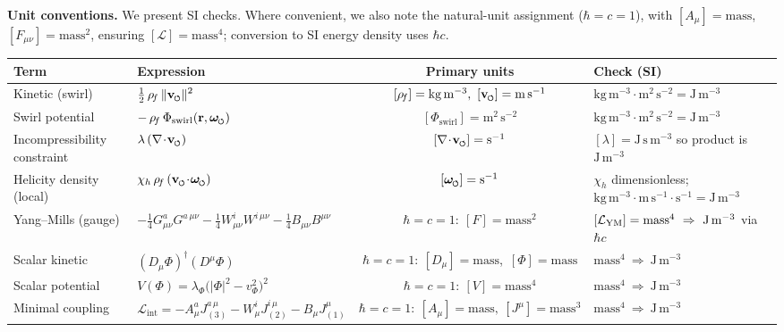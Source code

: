 \documentclass[11pt]{article}
\newcommand{\GsA}{G^a_{\mu\nu}}
\newcommand{\WsI}{W^i_{\mu\nu}}
\newcommand{\Bmn}{B_{\mu\nu}}
\begin{document}
\noindent\textbf{Unit conventions.}
We present SI checks. Where convenient, we also note the natural-unit assignment
($\hbar=c=1$), with \([A_\mu]=\text{mass}\), \([F_{\mu\nu}]=\text{mass}^2\), ensuring \([\mathcal L]=\text{mass}^4\);
conversion to SI energy density uses \(\hbar c\).

\begin{center}
	\renewcommand{\arraystretch}{1.2}
	\begin{tabular}{@{}llcl@{}}
		\toprule
		\textbf{Term} & \textbf{Expression} & \textbf{Primary units} & \textbf{Check (SI)} \\
		\midrule
		Kinetic (swirl) &
		$\displaystyle \tfrac12\,\rhof\,\|\vswirl\|^2$ &
		$[\rhof]=\mathrm{kg\,m^{-3}},\ [\vswirl]=\mathrm{m\,s^{-1}}$ &
		$\mathrm{kg\,m^{-3}}\cdot \mathrm{m^2\,s^{-2}}=\mathrm{J\,m^{-3}}$ \\

		Swirl potential &
		$\displaystyle -\,\rhof\,\Phi_{\text{swirl}}(\mathbf r,\omegas)$ &
		$[\Phi_{\text{swirl}}]=\mathrm{m^2\,s^{-2}}$ &
		$\mathrm{kg\,m^{-3}}\cdot \mathrm{m^2\,s^{-2}}=\mathrm{J\,m^{-3}}$ \\

		Incompressibility constraint &
		$\displaystyle \lambda\,(\nabla\!\cdot\!\vswirl)$ &
		$[\nabla\!\cdot\!\vswirl]=\mathrm{s^{-1}}$ &
		$[\lambda]=\mathrm{J\,s\,m^{-3}}$ so product is $\mathrm{J\,m^{-3}}$ \\

		Helicity density (local) &
		$\displaystyle \chi_h\,\rhof\,(\vswirl\!\cdot\!\omegas)$ &
		$[\omegas]=\mathrm{s^{-1}}$ &
		$\chi_h$ dimensionless; $\mathrm{kg\,m^{-3}}\cdot \mathrm{m\,s^{-1}}\cdot \mathrm{s^{-1}}=\mathrm{J\,m^{-3}}$ \\

		Yang--Mills (gauge) &
		$\displaystyle -\tfrac14 \GsA G^{a\,\mu\nu}
		-\tfrac14 \WsI W^{i\,\mu\nu}
		-\tfrac14 \Bmn B^{\mu\nu}$ &
		$\hbar=c=1:\ [F]=\text{mass}^2$ &
		$[\mathcal L_{\rm YM}]=\text{mass}^4\ \Rightarrow\ \mathrm{J\,m^{-3}}$ via $\hbar c$ \\

		Scalar kinetic &
		$\displaystyle (D_\mu\Phi)^\dagger(D^\mu\Phi)$ &
		$\hbar=c=1:\ [D_\mu]=\text{mass}$,\ $[\Phi]=\text{mass}$ &
		$\text{mass}^4\ \Rightarrow\ \mathrm{J\,m^{-3}}$ \\

		Scalar potential &
		$\displaystyle V(\Phi)=\lambda_\Phi\big(|\Phi|^2-v_\Phi^2\big)^2$ &
		$\hbar=c=1:\ [V]=\text{mass}^4$ &
		$\text{mass}^4\ \Rightarrow\ \mathrm{J\,m^{-3}}$ \\

		Minimal coupling &
		$\displaystyle \mathcal L_{\text{int}}=-A^a_\mu J_{(3)}^{a\,\mu}-W^i_\mu J_{(2)}^{i\,\mu}-B_\mu J_{(1)}^\mu$ &
		$\hbar=c=1:\ [A_\mu]=\text{mass},\ [J^\mu]=\text{mass}^3$ &
		$\text{mass}^4\ \Rightarrow\ \mathrm{J\,m^{-3}}$ \\
		\bottomrule
	\end{tabular}
\end{center}
\end{document}
